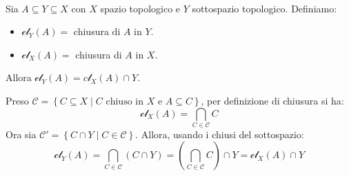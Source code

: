 \begin{lemming}~{}\\
Sia $A\subseteq Y\subseteq X$ con $X$ spazio topologico e $Y$ sottospazio topologico. Definiamo:
\begin{itemize}
\item $\mathcal{cl}_Y\left(A\right)=$ chiusura di $A$ in $Y$.
\item $\mathcal{cl}_X\left(A\right)=$ chiusura di $A$ in $X$.
\end{itemize}
Allora $\mathcal{cl}_Y\left(A\right)=c\mathcal{l}_X\left(A\right)\cap Y$.
\end{lemming}
\begin{demonstration}
Preso $\mathcal{C}=\left\{C\subseteq X\mid C\text{ chiuso in }X\text{ e } A\subseteq C\right\}$, per definizione di chiusura si ha:
\begin{equation*}
\mathcal{cl}_X\left(A\right)=\bigcap_{C\in\mathcal{C}}C
\end{equation*}
Ora sia $\mathcal{C}'=\left\{C\cap Y\mid C\in\mathcal{C}\right\}$. Allora, usando i chiusi del sottospazio:
\begin{equation*}
\mathcal{cl}_Y\left(A\right)=\bigcap_{C\in\mathcal{C}}\left(C\cap Y\right)=\left(\bigcap_{C\in\mathcal{C}}C\right)\cap Y=\mathcal{cl}_X\left(A\right)\cap Y
\end{equation*}
\vspace{-3mm}
\end{demonstration}

